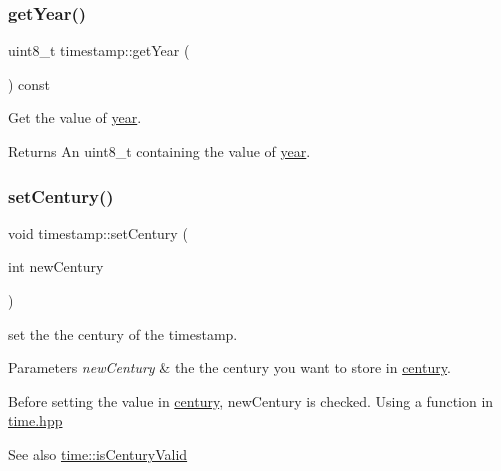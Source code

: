\subsubsection{\texorpdfstring{get\+Year()}{getYear()}}
{\footnotesize\ttfamily uint8\+\_\+t timestamp\+::get\+Year (\begin{DoxyParamCaption}{ }\end{DoxyParamCaption}) const}



Get the value of \mbox{\hyperlink{classtimestamp_a6df342bdd1101cf67f9a4831d5372d58}{year}}. 

\begin{DoxyReturn}{Returns}
An uint8\+\_\+t containing the value of \mbox{\hyperlink{classtimestamp_a6df342bdd1101cf67f9a4831d5372d58}{year}}. 
\end{DoxyReturn}
\mbox{\label{classtimestamp_ad7c219bebf2b101f13f0a48e435ad888}} 
\subsubsection{\texorpdfstring{set\+Century()}{setCentury()}}
{\footnotesize\ttfamily void timestamp\+::set\+Century (\begin{DoxyParamCaption}\item[{int}]{new\+Century }\end{DoxyParamCaption})}



set the the century of the timestamp. 


\begin{DoxyParams}{Parameters}
{\em new\+Century} & the the century you want to store in \mbox{\hyperlink{classtimestamp_afe83888ffa38c1615a3d12b012f235b3}{century}}.\\
\hline
\end{DoxyParams}
Before setting the value in \mbox{\hyperlink{classtimestamp_afe83888ffa38c1615a3d12b012f235b3}{century}}, new\+Century is checked. Using a function in \mbox{\hyperlink{time_8hpp_source}{time.\+hpp}} \begin{DoxySeeAlso}{See also}
\mbox{\hyperlink{classtime_a01413b7e5754345cf032cc7afa13efb0}{time\+::is\+Century\+Valid}} 
\end{DoxySeeAlso}
\mbox{\label{classtimestamp_a7392ce4abda5f63e95462bd99691b719}} 
